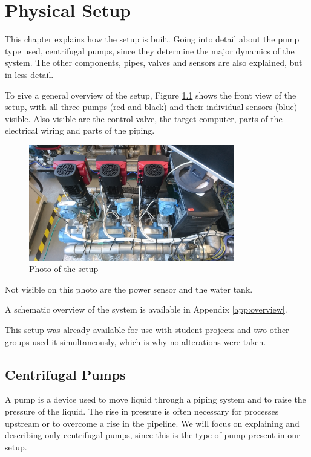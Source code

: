 \chapter{Physical Setup}\label{ch:physsetup}

This chapter explains how the setup is built.
Going into detail about the pump type used,
centrifugal pumps, since they determine the major dynamics of the system.
The other components, pipes, valves and sensors are also explained,
but in less detail.

To give a general overview of the setup,
Figure \ref{fig:setup_photo} shows the front view of the setup,
with all three pumps (red and black) and their individual sensors (blue) visible.
Also visible are the control valve, the target computer,
parts of the electrical wiring and parts of the piping.

\begin{figure}[h]
    \centering
    \includegraphics[width=0.8\textwidth]{photos/setup_photo}
    \caption{Photo of the setup}
    \label{fig:setup_photo}
\end{figure}

Not visible on this photo are the power sensor and the water tank.

A schematic overview of the system is available in Appendix \ref{app:overview}.

This setup was already available for use with student projects
and two other groups used it simultaneously,
which is why no alterations were taken.

\section{Centrifugal Pumps}
A pump is a device used to move liquid through a piping system and to 
raise the pressure of the liquid.
The rise in pressure is often necessary for processes upstream
or to overcome a rise in the pipeline.
We will focus on explaining and describing only centrifugal pumps,
since this is the type of pump present in our setup. 


